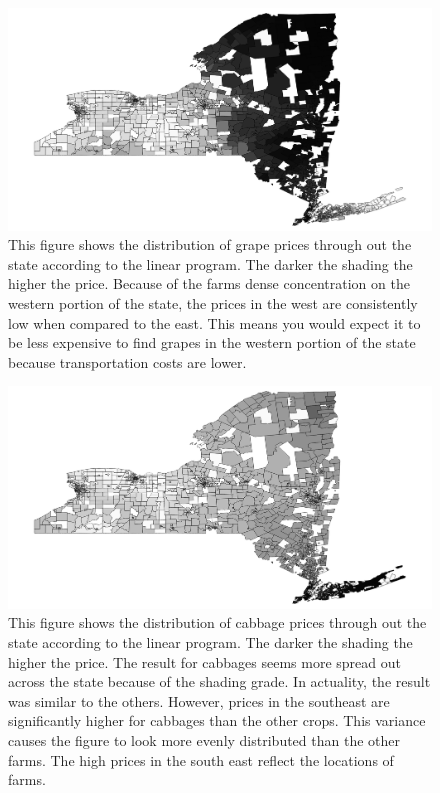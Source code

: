 \documentclass{report}
\begin{document}
\begin{figure}
\centering
\begin{framed}
\includegraphics[scale=.50]{prices_69}
\caption{This figure shows the distribution of grape prices through out the state according to the linear program. The darker the shading the higher the price. Because of the farms dense concentration on the western portion of the state, the prices in the west are consistently low when compared to the east. This means you would expect it to be less expensive to find grapes in the western portion of the state because transportation costs are lower.}
\label{fig:prices_69}
\end{framed}
\end{figure}


\begin{figure}
\centering
\begin{framed}
\includegraphics[scale=.50]{prices_243}
\caption{This figure shows the distribution of cabbage prices through out the state according to the linear program. The darker the shading the higher the price. The result for cabbages seems more spread out across the state because of the shading grade. In actuality, the result was similar to the others. However, prices in the southeast are significantly higher for cabbages than the other crops. This variance causes the figure to look more evenly distributed than the other farms. The high prices in the south east reflect the locations of farms.}
\label{fig:prices_243}
\end{framed}
\end{figure}
\end{document}

